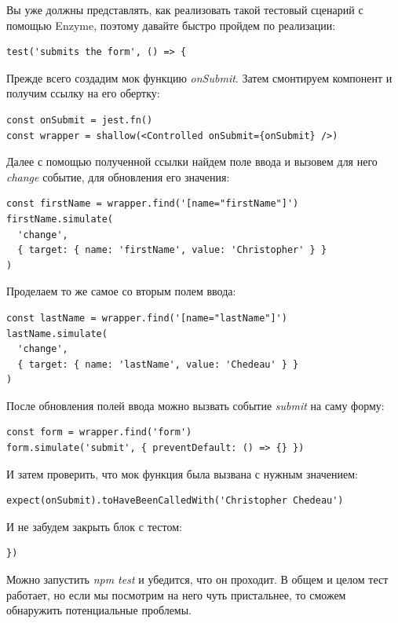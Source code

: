 Вы уже должны представлять, как реализовать такой тестовый сценарий с помощью Enzyme, поэтому давайте быстро пройдем по реализации:

\begin{lstlisting}
test('submits the form', () => {
\end{lstlisting}

Прежде всего создадим мок функцию \textit{onSubmit}. Затем смонтируем компонент и получим ссылку на его обертку:

\begin{lstlisting}
const onSubmit = jest.fn()
const wrapper = shallow(<Controlled onSubmit={onSubmit} />)
\end{lstlisting}

Далее с помощью полученной ссылки найдем поле ввода и вызовем для него \textit{change} событие, для обновления его значения:

\begin{lstlisting}
const firstName = wrapper.find('[name="firstName"]')
firstName.simulate(
  'change',
  { target: { name: 'firstName', value: 'Christopher' } }
)
\end{lstlisting}

Проделаем то же самое со вторым полем ввода:

\begin{lstlisting}
const lastName = wrapper.find('[name="lastName"]')
lastName.simulate(
  'change',
  { target: { name: 'lastName', value: 'Chedeau' } }
)
\end{lstlisting}

После обновления полей ввода можно вызвать событие \textit{submit} на саму форму:

\begin{lstlisting}
const form = wrapper.find('form')
form.simulate('submit', { preventDefault: () => {} })
\end{lstlisting}

И затем проверить, что мок функция была вызвана с нужным значением:

\begin{lstlisting}
expect(onSubmit).toHaveBeenCalledWith('Christopher Chedeau')
\end{lstlisting}

И не забудем закрыть блок с тестом:

\begin{lstlisting}
})
\end{lstlisting}

Можно запустить \textit{npm test} и убедится, что он проходит. В общем и целом тест работает, но если мы посмотрим на него чуть пристальнее, то сможем обнаружить потенциальные проблемы.

